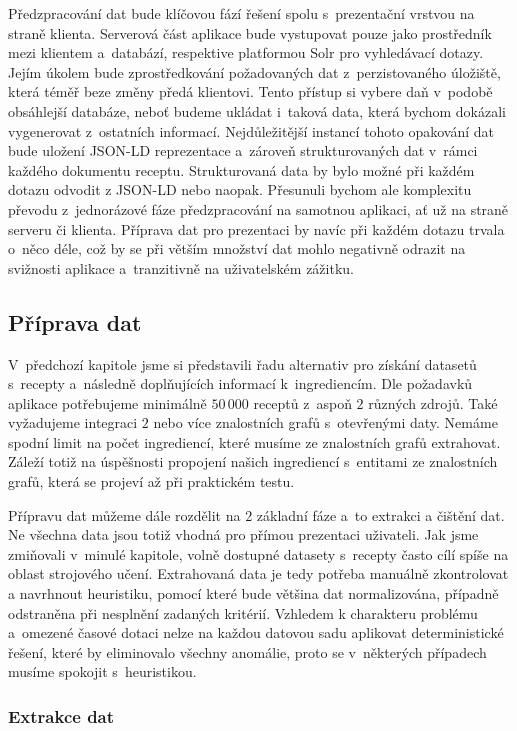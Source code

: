 Předzpracování dat bude klíčovou fází řešení spolu s~prezentační vrstvou na straně klienta. Serverová část aplikace bude vystupovat pouze jako prostředník mezi klientem a~databází, respektive platformou Solr pro vyhledávací dotazy. Jejím úkolem bude zprostředkování požadovaných dat z~perzistovaného úložiště, která téměř beze změny předá klientovi. Tento přístup si vybere daň v~podobě obsáhlejší databáze, neboť budeme ukládat i~taková data, která bychom dokázali vygenerovat z~ostatních informací. Nejdůležitější instancí tohoto opakování dat bude uložení JSON-LD reprezentace a~zároveň strukturovaných dat v~rámci každého dokumentu receptu. Strukturovaná data by bylo možné při každém dotazu odvodit z JSON-LD nebo naopak. Přesunuli bychom ale komplexitu převodu z~jednorázové fáze předzpracování na samotnou aplikaci, ať už na straně serveru či klienta. Příprava dat pro prezentaci by navíc při každém dotazu trvala o~něco déle, což by se při větším množství dat mohlo negativně odrazit na svižnosti aplikace a~tranzitivně na uživatelském zážitku.

\subsection{Příprava dat}

V~předchozí kapitole jsme si představili řadu alternativ pro získání datasetů s~recepty a~následně doplňujících informací k~ingrediencím. Dle požadavků aplikace potřebujeme minimálně $50\,000$ receptů z~aspoň $2$ různých zdrojů. Také vyžadujeme integraci $2$ nebo více znalostních grafů s~otevřenými daty. Nemáme spodní limit na počet ingrediencí, které musíme ze znalostních grafů extrahovat. Záleží totiž na úspěšnosti propojení našich ingrediencí s~entitami ze znalostních grafů, která se projeví až při praktickém testu.

Přípravu dat můžeme dále rozdělit na $2$ základní fáze a~to extrakci a čištění dat. Ne všechna data jsou totiž vhodná pro přímou prezentaci uživateli. Jak jsme zmiňovali v~minulé kapitole, volně dostupné datasety s~recepty často cílí spíše na oblast strojového učení. Extrahovaná data je tedy potřeba manuálně zkontrolovat a navrhnout heuristiku, pomocí které bude většina dat normalizována, případně odstraněna při nesplnění zadaných kritérií. Vzhledem k charakteru problému a~omezené časové dotaci nelze na každou datovou sadu aplikovat deterministické řešení, které by eliminovalo všechny anomálie, proto se v~některých případech musíme spokojit s~heuristikou.

\subsubsection{Extrakce dat}

